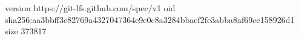 version https://git-lfs.github.com/spec/v1
oid sha256:aa3bbff3e82769a4327047364e9e0c8a3284bbaef2fe3abba8af69ce158926d1
size 373817
